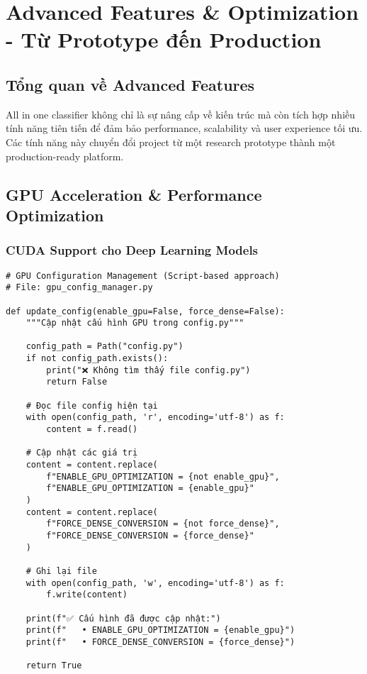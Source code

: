 \section{Advanced Features \& Optimization - Từ Prototype đến Production}

\subsection{Tổng quan về Advanced Features}

All in one classifier không chỉ là sự nâng cấp về kiến trúc mà còn tích hợp nhiều tính năng tiên tiến để đảm bảo performance, scalability và user experience tối ưu. Các tính năng này chuyển đổi project từ một research prototype thành một production-ready platform.

\subsection{GPU Acceleration \& Performance Optimization}

\subsubsection{CUDA Support cho Deep Learning Models}

\begin{verbatim}
# GPU Configuration Management (Script-based approach)
# File: gpu_config_manager.py

def update_config(enable_gpu=False, force_dense=False):
    """Cập nhật cấu hình GPU trong config.py"""
    
    config_path = Path("config.py")
    if not config_path.exists():
        print("❌ Không tìm thấy file config.py")
        return False
    
    # Đọc file config hiện tại
    with open(config_path, 'r', encoding='utf-8') as f:
        content = f.read()
    
    # Cập nhật các giá trị
    content = content.replace(
        f"ENABLE_GPU_OPTIMIZATION = {not enable_gpu}", 
        f"ENABLE_GPU_OPTIMIZATION = {enable_gpu}"
    )
    content = content.replace(
        f"FORCE_DENSE_CONVERSION = {not force_dense}", 
        f"FORCE_DENSE_CONVERSION = {force_dense}"
    )
    
    # Ghi lại file
    with open(config_path, 'w', encoding='utf-8') as f:
        f.write(content)
    
    print(f"✅ Cấu hình đã được cập nhật:")
    print(f"   • ENABLE_GPU_OPTIMIZATION = {enable_gpu}")
    print(f"   • FORCE_DENSE_CONVERSION = {force_dense}")
    
    return True
\end{verbatim}

